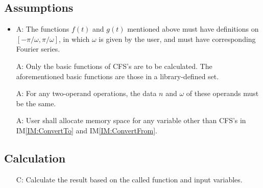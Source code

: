 \documentclass[12pt]{article}
\newcounter{assumpnum} %
\newcounter{calnum} %
\newcommand{\iref}[1]{IM\ref{#1}}
\begin{document}
\subsection{Assumptions}
\newcommand{\aitem}[1]{\item[A\refstepcounter{assumpnum}\theassumpnum \label{Ass:#1}:] }
\begin{itemize}

\aitem{FunctionProperty}
The functions $f(t)$ and $g(t)$ mentioned above must have definitions on 
$[-\pi/\omega, \pi/\omega]$, in which $\omega$ is given by the user, 
and must have corresponding Fourier series. 
\item[A\refstepcounter{assumpnum}\theassumpnum \label{Ass:BasicFunction}:] 
Only the basic functions of CFS's are to be calculated. The aforementioned 
basic functions are those in a library-defined set. 
\item[A\refstepcounter{assumpnum}\theassumpnum \label{Ass:CFSPropertyMatch}:] 
For any two-operand operations, the data $n$ and $\omega$ of these operands 
must be the same.  
\item[A\refstepcounter{assumpnum}\theassumpnum \label{Ass:Memory}:] 
User shall allocate memory space for any variable other than 
CFS's in \iref{IM:ConvertTo} and \iref{IM:ConvertFrom}. 
\end{itemize}

\subsection{Calculation} \label{sec_Calculation}
\begin{itemize}
\item[C\refstepcounter{calnum}\thecalnum \label{Cal:Normal}:] 
Calculate the result based on the called function and input variables.

\end{itemize}
\end{document}
